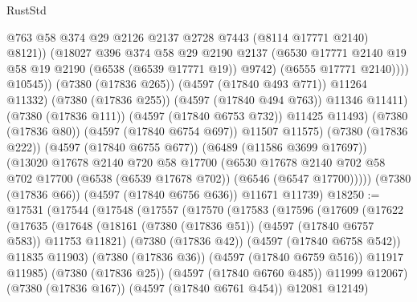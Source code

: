 \begin{lexlean}{RustStd}
\begin{coremodule}
                            @763
                            @58
                            @374
                            @29
                            @2126
                            @2137
                            @2728
                            @7443
                            (@8114 @17771 @2140)
                            @8121))
                        (@18027
                          @396
                          @374
                          @58
                          @29
                          @2190
                          @2137
                          (@6530 @17771 @2140 @19 @58 @19 @2190 (@6538 (@6539 @17771 @19)) @9742)
                          (@6555 @17771 @2140))))
                    @10545))
                (@7380 (@17836 @265))
                (@4597 (@17840 @493 @771))
                @11264
                @11332)
              (@7380 (@17836 @255))
              (@4597 (@17840 @494 @763))
              @11346
              @11411)
            (@7380 (@17836 @111))
            (@4597 (@17840 @6753 @732))
            @11425
            @11493)
          (@7380 (@17836 @80))
          (@4597 (@17840 @6754 @697))
          @11507
          @11575)
        (@7380 (@17836 @222))
        (@4597 (@17840 @6755 @677))
        (@6489 (@11586 @3699 @17697))
        (@13020
          @17678
          @2140
          @720
          @58
          @17700
          (@6530
            @17678
            @2140
            @702
            @58
            @702
            @17700
            (@6538 (@6539 @17678 @702))
            (@6546 (@6547 @17700)))))
      (@7380 (@17836 @66))
      (@4597 (@17840 @6756 @636))
      @11671
      @11739)
@18250 := @17531
    (@17544
      (@17548
        (@17557
          (@17570
            (@17583
              (@17596
                (@17609
                  (@17622
                    (@17635
                      (@17648
                        (@18161 (@7380 (@17836 @51)) (@4597 (@17840 @6757 @583)) @11753 @11821)
                        (@7380 (@17836 @42))
                        (@4597 (@17840 @6758 @542))
                        @11835
                        @11903)
                      (@7380 (@17836 @36))
                      (@4597 (@17840 @6759 @516))
                      @11917
                      @11985)
                    (@7380 (@17836 @25))
                    (@4597 (@17840 @6760 @485))
                    @11999
                    @12067)
                  (@7380 (@17836 @167))
                  (@4597 (@17840 @6761 @454))
                  @12081
                  @12149)

\end{coremodule}
\end{lexlean}
